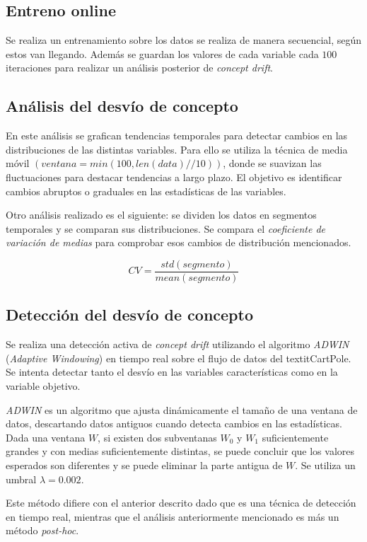 \documentclass[12pt,letterpaper]{article}
\begin{document}
\subsection{Entreno online}
Se realiza un entrenamiento sobre los datos se realiza de manera secuencial, según estos van llegando. Además se guardan los valores de cada variable cada $100$ iteraciones para realizar un análisis posterior de \textit{concept drift}.

\subsection{Análisis del desvío de concepto}
En este análisis se grafican tendencias temporales para detectar cambios en las distribuciones de las distintas variables. Para ello se utiliza la técnica de media móvil $(ventana = min(100, len(data)//10))$, donde se suavizan las fluctuaciones para destacar tendencias a largo plazo. El objetivo es identificar cambios abruptos o graduales en las estadísticas de las variables.

Otro análisis realizado es el siguiente: se dividen los datos en segmentos temporales y se comparan sus distribuciones. Se compara el \textit{coeficiente de variación de medias} para comprobar esos cambios de distribución mencionados.

$$CV=\frac{std(segmento)}{mean(segmento)}$$

\subsection{Detección del desvío de concepto}
Se realiza una detección activa de \textit{concept drift} utilizando el algoritmo \textit{ADWIN} \cite{Bifet2009} (\textit{Adaptive Windowing}) en tiempo real sobre el flujo de datos del textit{CartPole}. Se intenta detectar tanto el desvío en las variables características como en la variable objetivo.

\textit{ADWIN} es un algoritmo que ajusta dinámicamente el tamaño de una ventana de datos, descartando datos antiguos cuando detecta cambios en las estadísticas. Dada una ventana $W$, si existen dos subventanas $W_0$ y $W_1$
suficientemente grandes y con medias suficientemente distintas, se puede concluir que los valores esperados son diferentes y se puede eliminar la parte antigua de $W$. Se utiliza un umbral $\lambda = 0.002$.

Este método difiere con el anterior descrito dado que es una técnica de detección en tiempo real, mientras que el análisis anteriormente mencionado es más un método \textit{post-hoc}.
\end{document}
